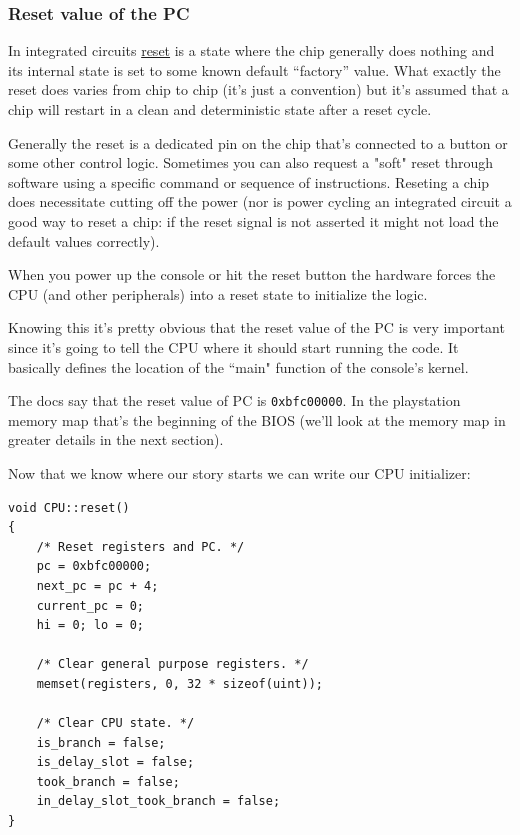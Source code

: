 \documentclass[a4paper]{article}
\newcommand{\code}[1] {\texttt{#1}}
\begin{document}
\subsubsection{Reset value of the PC}

In integrated circuits
\href{https://en.wikipedia.org/wiki/Reset_%28computing%29}{reset} is a
state where the chip generally does nothing and its internal state
is set to some known default ``factory'' value. What exactly the
reset does varies from chip to chip (it's just a convention) but
it's assumed that a chip will restart in a clean and deterministic
state after a reset cycle.

Generally the reset is a dedicated pin on the chip that's connected to
a button or some other control logic. Sometimes you can also request a
"soft" reset through software using a specific command or sequence of
instructions. Reseting a chip does necessitate cutting off the power
(nor is power cycling an integrated circuit a good way to reset a
chip: if the reset signal is not asserted it might not load the
default values correctly).

When you power up the console or hit the reset button the hardware
forces the CPU (and other peripherals) into a reset state to
initialize the logic.

Knowing this it's pretty obvious that the reset value of the
PC is very important since it's going to tell the CPU where
it should start running the code. It basically defines the location of
the ``main" function of the console's kernel.

The docs say that the reset value of PC is
\code{0xbfc00000}. In the playstation memory map that's the
beginning of the BIOS (we'll look at the memory map in greater details
in the next section).

Now that we know where our story starts we can write our CPU
initializer:

\begin{lstlisting}[caption={CPU reset code.}, label={code::cpureset}]
void CPU::reset()
{
    /* Reset registers and PC. */
    pc = 0xbfc00000;
    next_pc = pc + 4;
    current_pc = 0;
    hi = 0; lo = 0;

    /* Clear general purpose registers. */
    memset(registers, 0, 32 * sizeof(uint));

    /* Clear CPU state. */
    is_branch = false;
    is_delay_slot = false;
    took_branch = false;
    in_delay_slot_took_branch = false;
}
\end{lstlisting}
\end{document}
